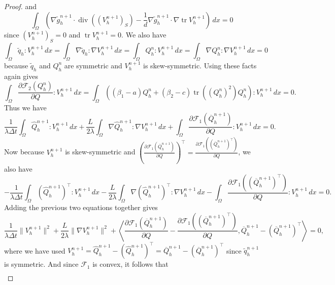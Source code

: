 \documentclass[10pt,letterpaper]{amsart}
\theoremstyle{definition}{\newtheorem{definition}[lemma]{Definition}}
\theoremstyle{note}{\newtheorem{claim}{Claim}[section]
\newtheorem*{claim*}{Claim}}
\numberwithin{equation}{section}
\begin{document}
\begin{proof}
	and
	\begin{equation*}
	\int_\Omega \left(\nabla\tilde g_h^{n+1}\cdot \operatorname{div}((V_h^{n+1})_S) - \frac1d\nabla\tilde g_h^{n+1}\cdot\nabla\operatorname{tr}V_h^{n+1}\right)\, dx = 0
	\end{equation*}
	since $(V_h^{n+1})_S = 0$ and $\operatorname{tr}V_h^{n+1} = 0$. We also have
	\[
	\int_\Omega \tilde q_h : V_h^{n+1}\, dx = \int_\Omega \nabla \tilde q_h : \nabla V_h^{n+1}\, dx = \int_\Omega Q_h^n:V_h^{n+1}\, dx = \int_\Omega \nabla Q_h^n : \nabla V_h^{n+1}\, dx = 0
	\]
	because $\tilde q_h$ and $Q_h^n$ are symmetric and $V_h^{n+1}$ is skew-symmetric. Using these facts again gives
	\[
	\int_\Omega \frac{\partial \mathcal{F}_2(Q_h^n)}{\partial Q}:V_h^{n+1}\, dx = \int_\Omega \left((\beta_1 - a)Q_h^n + (\beta_2 - c)\operatorname{tr}((Q_h^n)^2)Q_h^n\right):V_h^{n+1}\, dx = 0.
	\]
	Thus we have
	\begin{equation}
	\frac{1}{\lambda\Delta t}\int_\Omega \widehat{Q}_h^{n+1}:V_h^{n+1}\, dx + \frac{L}{2\lambda}\int_\Omega \nabla \widehat{Q}_h^{n+1}: \nabla V_h^{n+1}\, dx + \int_\Omega \frac{\partial \mathcal{F}_1(\overline{Q}_h^{n+1})}{\partial Q}: V_h^{n+1}\, dx = 0.
	\end{equation}
	Now because $V_h^{n+1}$ is skew-symmetric and $\left(\frac{\partial \mathcal{F}_1(\overline{Q}_h^{n+1})}{\partial Q}\right)^\top = \frac{\partial \mathcal{F}_1((\overline{Q}_h^{n+1})^\top)}{\partial Q}$, we also have
	\begin{equation}
	-\frac{1}{\lambda\Delta t}\int_\Omega (\widehat{Q}_h^{n+1})^\top:V_h^{n+1}\, dx - \frac{L}{2\lambda}\int_\Omega \nabla (\widehat{Q}_h^{n+1})^\top: \nabla V_h^{n+1}\, dx - \int_\Omega \frac{\partial \mathcal{F}_1((\overline{Q}_h^{n+1})^\top)}{\partial Q}: V_h^{n+1}\, dx = 0.
	\end{equation}
	Adding the previous two equations together gives
	\begin{equation}
	\frac{1}{\lambda\Delta t}\|V_h^{n+1}\|^2 + \frac{L}{2\lambda}\|\nabla V_h^{n+1}\|^2 + \left\langle \frac{\partial \mathcal{F}_1(\overline{Q}_h^{n+1})}{\partial Q} - \frac{\partial \mathcal{F}_1((\overline{Q}_h^{n+1})^\top)}{\partial Q}, \overline{Q}_h^{n+1} - (\overline{Q}_h^{n+1})^\top\right\rangle = 0,
	\end{equation}
 where we have used $V_h^{n+1} = \widehat{Q}_h^{n+1} - (\widehat{Q}_h^{n+1})^\top = \overline{Q}_h^{n+1} - (\overline{Q}_h^{n+1})^\top$ since $\tilde q_h^{n+1}$ is symmetric.
	And since $\mathcal{F}_1$ is convex, it follows that
	\begin{align*}

\end{align*}
\end{proof}
\end{document}
